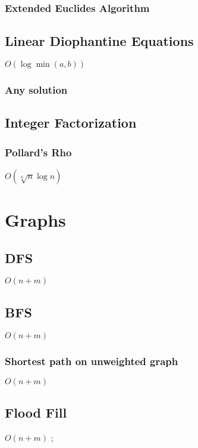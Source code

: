 \documentclass{article}
\begin{document}
\subsubsection{Extended Euclides Algorithm}


\subsection{Linear Diophantine Equations}
$O(\log \min (a, b))$
\subsubsection{Any solution}


\subsection{Integer Factorization}
\subsubsection{Pollard's Rho}
$O(\sqrt[4]{n}\log n)$


\section{Graphs}
\subsection{DFS}
$O(n+m)$


\subsection{BFS}
$O(n+m)$


\subsubsection{Shortest path on unweighted graph}
$O(n+m)$


\subsection{Flood Fill}
$O(n+m)$
;
\end{document}
